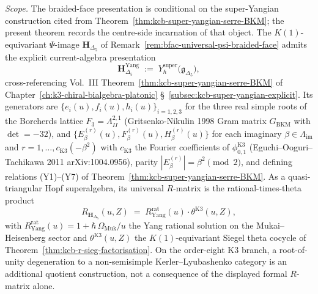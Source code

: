 \begin{theorem}
\label{thm:bfac-super-yangian-braided-face}
\noindent\emph{Scope.} The braided-face presentation is conditional on
the super-Yangian construction cited from
Theorem~\ref{thm:kcb-super-yangian-serre-BKM}; the present theorem
records the centre-side incarnation of that object.
The $K(1)$-equivariant $\Psi$-image $\mathbf H_{\Delta_5}$ of
Remark~\ref{rem:bfac-universal-psi-braided-face} admits the explicit
current-algebra presentation
\[
 \mathbf H_{\Delta_5}^{\mathrm{Yang}}
 \;:=\;
 Y_\hbar^{\mathrm{super}}\!\bigl(\mathfrak{g}_{\Delta_5}\bigr),
\]
cross-referencing Vol.~III
Theorem~\ref{thm:kcb-super-yangian-serre-BKM} of
Chapter~\ref{ch:k3-chiral-bialgebra-platonic}
\S~\ref{subsec:kcb-super-yangian-explicit}. Its generators are
$\{e_i(u), f_i(u), h_i(u)\}_{i=1,2,3}$ for the three real simple roots
of the Borcherds lattice $F_3 = \Lambda^{2,1}_{II}$
(Gritsenko-Nikulin 1998 Gram matrix $G_{\mathrm{BKM}}$ with $\det = -32$),
and $\{E_\beta^{(r)}(u), F_\beta^{(r)}(u), H_\beta^{(r)}(u)\}$ for each
imaginary $\beta\in\Lambda_{\mathrm{im}}$ and
$r = 1,\ldots,c_{\mathrm{K3}}(-\beta^2)$ with $c_{\mathrm{K3}}$ the
Fourier coefficients of $\phi_{0,1}^{\mathrm{K3}}$
(Eguchi--Ooguri--Tachikawa 2011 \textup{arXiv:1004.0956}), parity
$|E_\beta^{(r)}| = \beta^2\pmod 2$, and defining relations (Y1)--(Y7) of
Theorem~\ref{thm:kcb-super-yangian-serre-BKM}. As a quasi-triangular
Hopf superalgebra, its universal $R$-matrix is the
rational-times-theta product
\[
 R_{\mathbf H_{\Delta_5}}(u, Z)
 \;=\;
 R^{\mathrm{rat}}_{\mathrm{Yang}}(u)\cdot\theta^{\mathrm{K3}}(u, Z),
\]
with $R^{\mathrm{rat}}_{\mathrm{Yang}}(u) = 1 + \hbar\,\Omega_{\mathrm{Muk}}/u$
the Yang rational solution on the Mukai--Heisenberg sector and
$\theta^{\mathrm{K3}}(u, Z)$ the $K(1)$-equivariant Siegel theta cocycle
of Theorem~\ref{thm:kcb-r-sieg-factorisation}. On the order-eight K3
branch, a root-of-unity degeneration to a non-semisimple
Kerler--Lyubashenko category is an additional quotient construction,
not a consequence of the displayed formal \(R\)-matrix alone.
\end{theorem}

